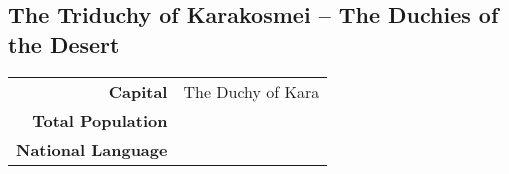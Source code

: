\subsection{The Triduchy of Karakosmei -- The Duchies of the Desert}
\begin{tabular}{r | l}
    \textbf{Capital} & The Duchy of Kara\\
    \textbf{Total Population} & \\
    \textbf{National Language} & 
\end{tabular}